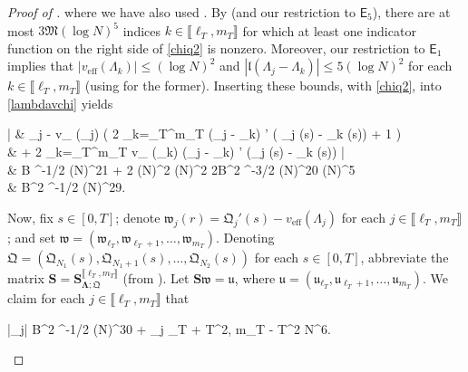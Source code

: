 \documentclass{amsart}
\numberwithin{equation}{section}
\DeclareMathOperator{\eff}{eff}
\theoremstyle{remark}
\theoremstyle{definition}
\begin{document}
\begin{proof}[Proof of ]
		\noindent where we have also used . By  (and our restriction to $\mathsf{E}_5$), there are at most $3 \mathfrak{M} (\log N)^5$ indices $k \in \llbracket \ell_T, m_T \rrbracket$ for which at least one indicator function on the right side of \eqref{chiq2} is nonzero. Moreover, our restriction to $\mathsf{E}_1$ implies that $|v_{\eff} (\Lambda_k)| \le (\log N)^2$ and $|\mathfrak{l} (\Lambda_j-\Lambda_k)| \le 5 (\log N)^2$ for each $k \in \llbracket \ell_T, m_T \rrbracket$ (using  for the former). Inserting these bounds, with \eqref{chiq2}, into \eqref{lambdavchi} yields 
		\begin{flalign}
			\label{lambdajqjderivative}
			\begin{aligned}
				\Bigg| & \Lambda_j -  v_{\eff} (\Lambda_j) \cdot \bigg( 2 \displaystyle\sum_{k=\ell_T}^{m_T}  (\Lambda_j - \Lambda_k) \cdot \chi' ( \mathfrak{Q}_j (s) - _k (s)) + 1 \bigg) \\
				& \qquad \qquad \qquad \qquad + 2 \displaystyle\sum_{k=\ell_T}^{m_T} v_{\eff} (\Lambda_k) \cdot {} (\Lambda_j - \Lambda_k) \cdot \chi' (\mathfrak{Q}_j (s) - _k (s)) \Bigg| \\
				& \qquad \quad \le B ^{-1/2} (\log N)^{21} + 2 \cdot (\log N)^2  (\log N)^2 \cdot 2B^2 ^{-3/2} (\log N)^{20}   (\log N)^5 \\
				&  \qquad \quad {} B^2 ^{-1/2} (\log N)^{29}.
			\end{aligned} 
		\end{flalign} 
		
		Now, fix $s \in [0,T]$; denote $\mathfrak{w}_j (r) = \mathfrak{Q}_j' (s) - v_{\eff} (\Lambda_j)$ for each $j \in \llbracket \ell_T, m_T \rrbracket$; and set $\bm{\mathfrak{w}} = (\mathfrak{w}_{\ell_T}, \mathfrak{w}_{\ell_T+1}, \ldots , \mathfrak{w}_{m_T})$. Denoting $\bm{\mathfrak{Q}} = (\mathfrak{Q}_{N_1} (s), \mathfrak{Q}_{N_1+1}(s), \ldots , \mathfrak{Q}_{N_2} (s))$ for each $s \in [0, T]$, abbreviate the matrix $\bm{S} = \bm{S}_{\bm{\Lambda}; \bm{\mathfrak{Q}}}^{\llbracket \ell_T, m_T \rrbracket}$ (from ). Let $\bm{S} \bm{\mathfrak{w}} = \bm{\mathfrak{u}}$, where $\bm{\mathfrak{u}} = (\mathfrak{u}_{\ell_T}, \mathfrak{u}_{\ell_T+1}, \ldots , \mathfrak{u}_{m_T})$. We claim for each $j \in \llbracket \ell_T, m_T \rrbracket$ that 
		\begin{flalign}
			\label{uj} 
			|_j| \le B^2 ^{-1/2} (\log N)^{30} +  _{j \notin \llbracket \ell_T + T^2, m_T - T^2 \rrbracket} \cdot N^6.
		\end{flalign}
		

\end{proof}
\end{document}
